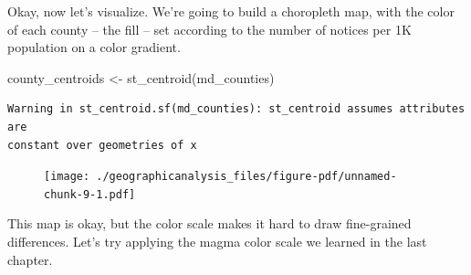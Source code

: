 \documentclass[
  letterpaper,
  DIV=11,
  numbers=noendperiod]{scrreprt}
\newenvironment{Shaded}{\begin{snugshade}}{\end{snugshade}}
\newcommand{\AttributeTok}[1]{\textcolor[rgb]{0.40,0.45,0.13}{#1}}
\newcommand{\ConstantTok}[1]{\textcolor[rgb]{0.56,0.35,0.01}{#1}}
\newcommand{\DecValTok}[1]{\textcolor[rgb]{0.68,0.00,0.00}{#1}}
\newcommand{\FunctionTok}[1]{\textcolor[rgb]{0.28,0.35,0.67}{#1}}
\newcommand{\NormalTok}[1]{\textcolor[rgb]{0.00,0.23,0.31}{#1}}
\newcommand{\OtherTok}[1]{\textcolor[rgb]{0.00,0.23,0.31}{#1}}
\newcommand{\SpecialCharTok}[1]{\textcolor[rgb]{0.37,0.37,0.37}{#1}}
\begin{document}
Okay, now let's visualize. We're going to build a choropleth map, with
the color of each county -- the fill -- set according to the number of
notices per 1K population on a color gradient.

\begin{Shaded}
\begin{Highlighting}[]
\NormalTok{county\_centroids }\OtherTok{\textless{}{-}} \FunctionTok{st\_centroid}\NormalTok{(md\_counties)}
\end{Highlighting}
\end{Shaded}

\begin{verbatim}
Warning in st_centroid.sf(md_counties): st_centroid assumes attributes are
constant over geometries of x
\end{verbatim}

\begin{Shaded}
\end{Shaded}

\begin{figure}[H]

{\centering \texttt{[image: ./geographicanalysis\_files/figure-pdf/unnamed-chunk-9-1.pdf]}

}

\end{figure}

This map is okay, but the color scale makes it hard to draw fine-grained
differences. Let's try applying the magma color scale we learned in the
last chapter.
\end{document}
